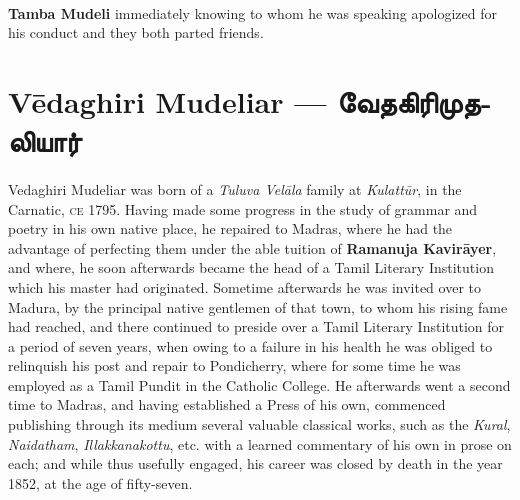 \documentclass{article}
\newcommand{\TamilBold}[1]{\texttamil{\textbf{#1}}}
\newcommand{\tambold}[1]{\TamilBold{#1}}
\begin{document}
\paragraph{}
\textbf{Tamba Mudeli} immediately knowing to whom he was speaking apologized for his conduct and they both parted friends.

\section{V\={e}daghiri Mudeliar --- \tambold{வேதகிரிமுதலியார்}}
\paragraph{}
Vedaghiri Mudeliar was born of a \emph{Tuluva Vel\={a}la} family at \emph{Kulatt\={u}r}, in the Carnatic, \textsc{ce} 1795. Having made some progress in the study of grammar and poetry in his own native place, he repaired to Madras, where he had the advantage of perfecting them under the able tuition of \textbf{Ramanuja Kavir\={a}yer}, and where, he soon afterwards became the head of a Tamil Literary Institution which his master had originated. Sometime afterwards he was invited over to Madura, by the principal native gentlemen of that town, to whom his rising fame had reached, and there continued to preside over a Tamil Literary Institution for a period of seven years, when owing to a failure in his health he was obliged to relinquish his post and repair to Pondicherry, where for some time he was employed as a Tamil Pundit in the Catholic College. He afterwards went a second time to Madras, and having established a Press of his own, commenced publishing through its medium several valuable classical works, such as the \emph{Kural}, \emph{Naidatham}, \emph{Illakkanakottu}, etc. with a learned commentary of his own in prose on each; and while thus usefully engaged, his career was closed by death in the year 1852, at the age of fifty-seven.
\end{document}
